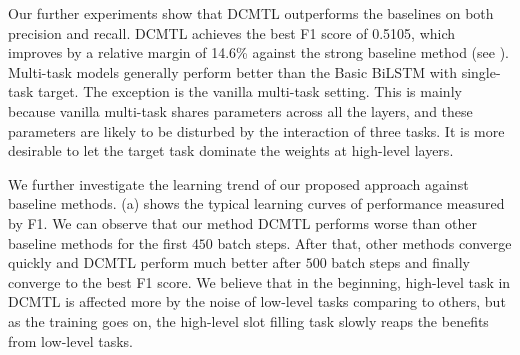 Our further experiments show that DCMTL outperforms the 
baselines on both precision and recall.
DCMTL achieves the best F1 score of 0.5105, 
which improves by a relative margin of 14.6\% 
against the strong baseline method (see ).
Multi-task models generally perform better than the Basic 
BiLSTM with single-task target.
The exception is the vanilla multi-task setting.
This is mainly because 
vanilla multi-task shares parameters across all the layers,
and these parameters are likely to be disturbed by the interaction of 
three tasks. It is more desirable to let the target task dominate the 
weights at high-level layers.

We further investigate the learning trend of our proposed approach against baseline methods.
(a) shows the typical learning curves 
of performance measured by F1.
We can observe that our method DCMTL 
performs worse than other baseline methods
for the first $450$ batch steps.
After that, other methods converge quickly 
and DCMTL perform much better after $500$ batch steps
and finally converge to the best F1 score.
We believe that in the beginning,
high-level task in DCMTL is affected more by the noise of low-level tasks comparing to others,
but as the training goes on,
the high-level slot filling task slowly reaps the benefits from low-level tasks.

